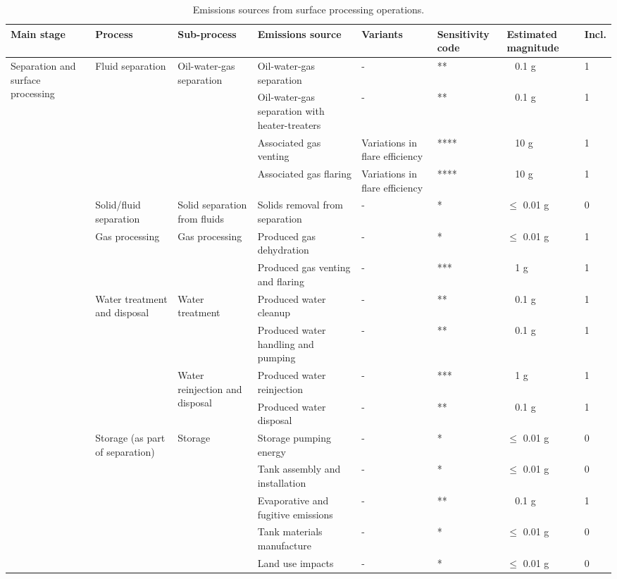 \documentclass[11pt]{report}
\begin{document}
{{{{\begin{landscape}
\begin{table}
\begin{scriptsize}
\caption{Emissions sources from surface processing operations.}
\label{tab:processing_sources}
\begin{tabular}{|p{}|p{}|p{}|p{}|p{}|p{}|p{}|p{}|}
\hline
\textbf{Main stage} & \textbf{Process} & \textbf{Sub-process} & \textbf{Emissions source} & \textbf{Variants}& \textbf{Sensitivity code} & \textbf{Estimated magnitude} & \textbf{Incl.}\\
\hline
\multirow{16}{0.08\columnwidth}{Separation and surface processing} & \multirow{4}{0.09\columnwidth}{Fluid separation} & \multirow{4}{0.12\columnwidth}{Oil-water-gas separation} & Oil-water-gas separation & - & ** & ~ 0.1 g & 1\\
\cline{4-8}
& & & Oil-water-gas separation with heater-treaters & - & ** & ~ 0.1 g & 1\\
\cline{4-8}
& & & Associated gas venting & Variations in flare efficiency & **** & ~ 10 g & 1\\
\cline{4-8}
& & & Associated gas flaring & Variations in flare efficiency & **** & ~ 10 g & 1\\
\cline{2-8}
& Solid/fluid separation & Solid separation from fluids & Solids removal from separation & - & * & $\leq$ 0.01 g & 0\\
\cline{2-8}
& \multirow{2}{0.09\columnwidth}{Gas processing} & \multirow{2}{0.12\columnwidth}{Gas processing} & Produced gas dehydration & - & * & $\leq$ 0.01 g & 1\\
\cline{4-8}
& & & Produced gas venting and flaring & - & *** & ~ 1 g & 1\\
\cline{2-8}
& \multirow{4}{0.09\columnwidth}{Water treatment and disposal} & \multirow{2}{0.12\columnwidth}{Water treatment} & Produced water cleanup & - & ** & ~ 0.1 g & 1\\
\cline{4-8}
& & & Produced water handling and pumping & - & ** & ~ 0.1 g & 1\\
\cline{3-8}
& & \multirow{2}{0.09\columnwidth}{Water reinjection and disposal} & Produced water reinjection & - & *** & ~ 1 g & 1\\
\cline{4-8}
& & & Produced water disposal & - & ** & ~ 0.1 g & 1\\
\cline{2-8}
& \multirow{5}{0.09\columnwidth}{Storage (as part of separation)} & \multirow{5}{0.12\columnwidth}{Storage} & Storage pumping energy & - & * & $\leq$ 0.01 g & 0\\
\cline{4-8}
& & & Tank assembly and installation & - & * & $\leq$ 0.01 g & 0\\
\cline{4-8}
& & & Evaporative and fugitive emissions & - & ** & ~ 0.1 g & 1\\
\cline{4-8}
& & & Tank materials manufacture & - & * & $\leq$ 0.01 g & 0\\
\cline{4-8}
& & & Land use impacts & - & * & $\leq$ 0.01 g & 0\\
\hline
\end{tabular}
\end{scriptsize}
\end{table}



\end{landscape}}}}}
\end{document}
